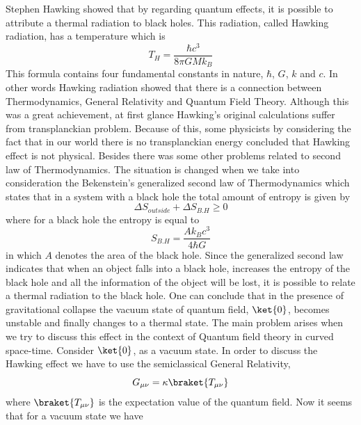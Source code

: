 \documentclass[12pt]{article}
\begin{document}
Stephen Hawking \cite{Hawking:1974rv} showed that by regarding quantum effects, it is possible to attribute a thermal radiation to black holes. This radiation, called Hawking radiation, has a temperature which is
\begin{equation}\label{eqn.hawking.temp}
   T_{H}=\frac{\hbar c^3}{8\pi G M k_{B}}
\end{equation}
This formula contains four fundamental constants in nature, $ \hbar$, $G$, $k$ and $c $. In other words Hawking radiation showed that there is a connection between Thermodynamics, General Relativity and Quantum Field Theory. Although this was a great achievement, at first glance Hawking's original calculations suffer from transplanckian problem. Because of this, some physicists by considering the fact that in our world there is no transplanckian energy concluded that Hawking effect is not physical. Besides there was some other problems related to second law of Thermodynamics. The situation is changed when we take into consideration the Bekenstein's generalized second law of Thermodynamics \cite{Bekenstein} which states that in a system with a black hole the total amount of entropy is given by
\begin{equation}\label{eqn.bekenstein}
 \Delta S_{outside} + \Delta S_{B.H} \geq 0
\end{equation}
where for a black hole the entropy is equal to
\begin{equation}\label{eqn.entropy. beken}
 S_{B.H}=\frac{A k_B c^3}{4\hbar G}
\end{equation}
in which $A$ denotes the area of the black hole.
Since the generalized second law indicates that when an object falls into a black hole, increases the entropy of the black hole and all the information of the object will be lost, it is possible to relate a thermal radiation to the black hole. One can conclude that in the presence of gravitational collapse the vacuum state of quantum field, $ \ket {0} $, becomes unstable and finally changes to a thermal state.
The main problem arises when we try to discuss this effect in the context of Quantum field theory in curved space-time.
Consider $\ket{0}$, as a vacuum state. In order to discuss the Hawking effect we have to use the semiclassical General Relativity,
\begin{equation}\label{eqn.semiclassic}
G_{\mu\nu}=\kappa\braket{T_{\mu\nu}}
\end{equation}
where $\braket{T_{\mu\nu}}$ is the expectation value of the quantum field. Now it seems that for a vacuum state we have
\end{document}
